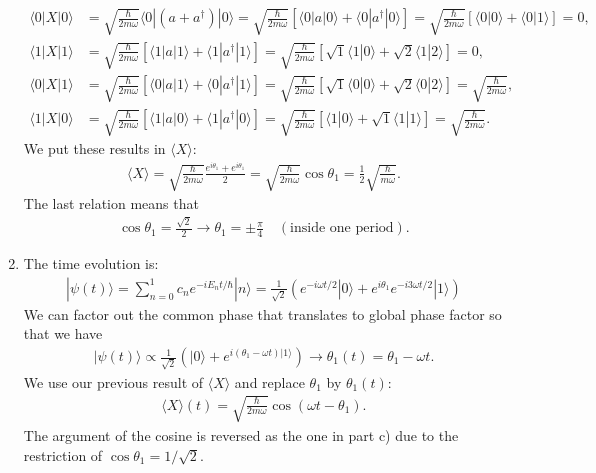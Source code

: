 \documentclass[letterpaper,11pt,twoside]{article}
\newcommand{\ket}[1]{|#1\rangle}
\newcommand{\braket}[1]{\langle#1\rangle}
\begin{document}
\begin{enumerate}
\begin{align*}
    \braket{0|X|0}&=\sqrt{\frac{\hbar}{2m\omega}}\braket{0|(a+a^\dagger)|0}=\sqrt{\frac{\hbar}{2m\omega}}\left[\braket{0|a|0}+\braket{0|a^\dagger|0}\right]=\sqrt{\frac{\hbar}{2m\omega}}\left[\braket{0|0}+\braket{0|1}\right]=0,\\
    \braket{1|X|1}&=\sqrt{\frac{\hbar}{2m\omega}}\left[\braket{1|a|1}+\braket{1|a^\dagger|1}\right]=\sqrt{\frac{\hbar}{2m\omega}}\left[\sqrt{1}\braket{1|0}+\sqrt{2}\braket{1|2}\right]=0,\\
    \braket{0|X|1}&=\sqrt{\frac{\hbar}{2m\omega}}\left[\braket{0|a|1}+\braket{0|a^\dagger|1}\right]=\sqrt{\frac{\hbar}{2m\omega}}\left[\sqrt{1}\braket{0|0}+\sqrt{2}\braket{0|2}\right]=\sqrt{\frac{\hbar}{2m\omega}},\\
    \braket{1|X|0}&=\sqrt{\frac{\hbar}{2m\omega}}\left[\braket{1|a|0}+\braket{1|a^\dagger|0}\right]=\sqrt{\frac{\hbar}{2m\omega}}\left[\braket{1|0}+\sqrt{1}\braket{1|1}\right]=\sqrt{\frac{\hbar}{2m\omega}}.
  \end{align*}
  We put these results in $\braket{X}$:
  \begin{align*}
    \braket{X}=\sqrt{\frac{\hbar}{2m\omega}}\frac{e^{i\theta_1}+e^{i\theta_1}}{2}=\sqrt{\frac{\hbar}{2m\omega}}\cos\theta_1=\frac{1}{2}\sqrt{\frac{\hbar}{m\omega}}.
  \end{align*}
  The last relation means that 
  \begin{align*}
    \cos\theta_1=\frac{\sqrt{2}}{2}\longrightarrow \theta_1=\pm\frac{\pi}{4}\quad(\text{inside one period}).
  \end{align*}
  \item The time evolution is:
  \begin{align*}
    \ket{\psi(t)}=\sum_{n=0}^1c_ne^{-iE_nt/\hbar}\ket{n}=\frac{1}{\sqrt{2}}\left(e^{-i\omega t/2}\ket{0}+e^{i\theta_1}e^{-i3\omega t/2}\ket{1}\right)
  \end{align*}
  We can factor out the common phase that translates to global phase factor so that we have
  \begin{align*}
    \ket{\psi(t)}\propto\frac{1}{\sqrt{2}}\left(\ket{0}+e^{i(\theta_1-\omega t)\ket{1}}\right)\longrightarrow\theta_1(t)=\theta_1-\omega t.
  \end{align*}
  We use our previous result of $\braket{X}$ and replace $\theta_1$ by $\theta_1(t)$:
  \begin{align*}
    \braket{X}(t)=\sqrt{\frac{\hbar}{2m\omega}}\cos(\omega t-\theta_1).
  \end{align*}
  The argument of the cosine is reversed as the one in part c) due to the restriction of $\cos\theta_1=1/\sqrt{2}$.
\end{enumerate}
\end{document}
